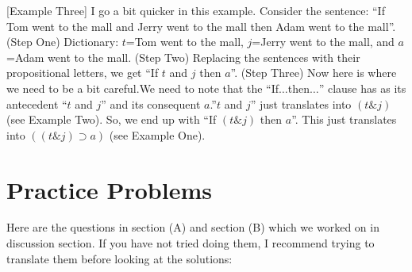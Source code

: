 \documentclass[
]{book}
\begin{document}
{[}Example Three{]} I go a bit quicker in this example. Consider the sentence: ``If Tom went to the mall and Jerry went to the mall then Adam went to the mall''. (Step One) Dictionary: \(t\)=Tom went to the mall, \(j\)=Jerry went to the mall, and \(a\)=Adam went to the mall. (Step Two) Replacing the sentences with their propositional letters, we get ``If \(t\) and \(j\) then \(a\)''. (Step Three) Now here is where we need to be a bit careful.We need to note that the ``If\(\ldots\)then\(\ldots\)'' clause has as its antecedent ``\(t\) and \(j\)'' and its consequent \(a\).''\(t\) and \(j\)'' just translates into \((t \& j)\) (see Example Two). So, we end up with ``If \((t \& j)\) then \(a\)''. This just translates into \(((t \& j) \supset a)\) (see Example One).

\hypertarget{practice-problems}{%
\section{Practice Problems}\label{practice-problems}}

Here are the questions in section (A) and section (B) which we worked on in discussion section. If you have not tried doing them, I recommend trying to translate them before looking at the solutions:
\end{document}
